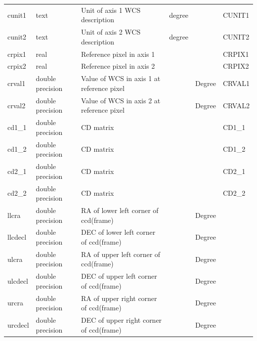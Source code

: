 \documentclass[12pt]{article}
\begin{document}
\begin{table}[thbp]
\begin{center}
{\begin{tabular}{llllll}
cunit1 & text & Unit of axis 1 WCS description                      & degree                     &             & CUNIT1  \\
cunit2 & text & Unit of axis 2 WCS description                      & degree                     &             & CUNIT2  \\
crpix1 & real & Reference pixel in axis 1                           &                            &             & CRPIX1  \\
crpix2 & real & Reference pixel in axis 2                           &                            &             & CRPIX2  \\
crval1 & double precision & Value of WCS in axis 1 at reference pixel           &                            & Degree      & CRVAL1  \\
crval2 & double precision & Value of WCS in axis 2 at reference pixel           &                            & Degree      & CRVAL2  \\
cd1\_1 & double precision & CD matrix                                           &                            &             & CD1\_1  \\
cd1\_2 & double precision & CD matrix                                           &                            &             & CD1\_2  \\
cd2\_1 & double precision & CD matrix                                           &                            &             & CD2\_1  \\
cd2\_2 & double precision & CD matrix                                           &                            &             & CD2\_2  \\
llcra & double precision & RA of lower left corner of ccd(frame)               &                            & Degree      &   \\
llcdecl & double precision & DEC of lower left corner of ccd(frame)              &                            & Degree      &   \\
ulcra & double precision & RA of upper left corner of ccd(frame)               &                            & Degree      &   \\
ulcdecl & double precision & DEC of upper left corner of ccd(frame)              &                            & Degree      &   \\
urcra & double precision & RA of upper right corner of ccd(frame)              &                            & Degree      &   \\
urcdecl & double precision & DEC of upper right corner of ccd(frame)             &                            & Degree      &   \\

\end{tabular}}
\end{center}
\end{table}
\end{document}
